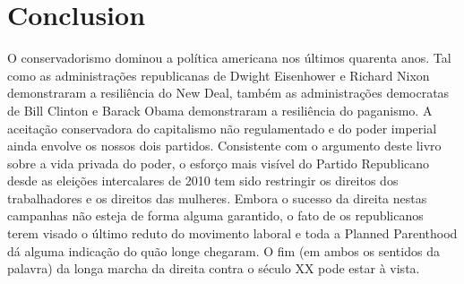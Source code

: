  
 \chapter{Conclusion}  

 \label{Conclusion}  
 
 
\par
 
 
 \textit{	}  

 
\par
 
 
 
\par
 

 \textbf{\textit{	} }  

 
\par
 
O conservadorismo dominou a política americana nos últimos quarenta anos. Tal como as administrações republicanas de Dwight Eisenhower e Richard Nixon demonstraram a resiliência do New Deal, também as administrações democratas de Bill Clinton e Barack Obama demonstraram a resiliência do paganismo. A aceitação conservadora do capitalismo não regulamentado e do poder imperial ainda envolve os nossos dois partidos. Consistente com o argumento deste livro sobre a vida privada do poder, o esforço mais visível do Partido Republicano desde as eleições intercalares de 2010 tem sido restringir os direitos dos trabalhadores e os direitos das mulheres. Embora o sucesso da direita nestas campanhas não esteja de forma alguma garantido, o fato de os republicanos terem visado o último reduto do movimento laboral e toda a Planned Parenthood dá alguma indicação do quão longe chegaram. O fim (em ambos os sentidos da palavra) da longa marcha da direita contra o século XX pode estar à vista.
 
\par
 
